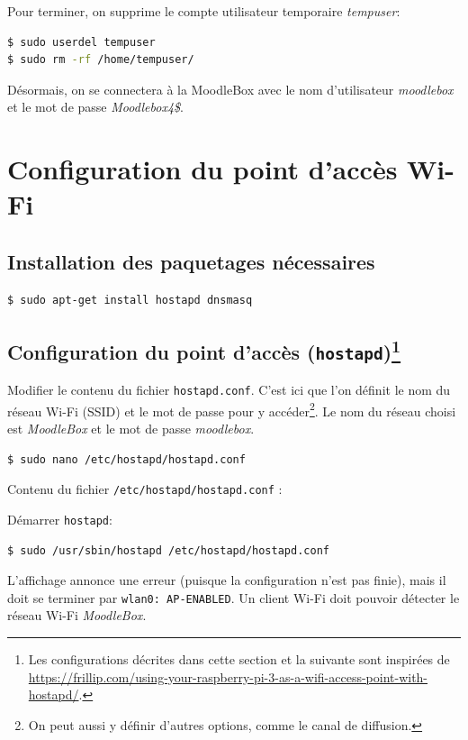\documentclass[11pt]{article}
\begin{document}
Pour terminer, on supprime le compte utilisateur temporaire \emph{tempuser}:
\begin{lstlisting}[language=bash]
$ sudo userdel tempuser
$ sudo rm -rf /home/tempuser/
\end{lstlisting}

Désormais, on se connectera à la MoodleBox avec le nom d'utilisateur \emph{moodlebox} et le mot de passe \emph{Moodlebox4\$}.

\section{Configuration du point d'accès Wi-Fi}

\subsection{Installation des paquetages nécessaires}

\begin{lstlisting}[language=bash]
$ sudo apt-get install hostapd dnsmasq
\end{lstlisting}

\subsection[Configuration du point d'accès (\lstinline{hostapd})]{Configuration du point d'accès (\lstinline{hostapd})\footnote{Les configurations décrites dans cette section et la suivante sont inspirées de \url{https://frillip.com/using-your-raspberry-pi-3-as-a-wifi-access-point-with-hostapd/}.}}

Modifier le contenu du fichier \lstinline{hostapd.conf}. C'est ici que l'on définit le nom du réseau Wi-Fi (SSID) et le mot de passe pour y accéder\footnote{On peut aussi y définir d'autres options, comme le canal de diffusion.}. Le nom du réseau choisi est \emph{MoodleBox} et le mot de passe \emph{moodlebox}.

\begin{lstlisting}[language=bash]
$ sudo nano /etc/hostapd/hostapd.conf
\end{lstlisting}

Contenu du fichier \lstinline{/etc/hostapd/hostapd.conf} :



\begin{verification}
Démarrer \lstinline{hostapd}:
\begin{lstlisting}[language=bash]
$ sudo /usr/sbin/hostapd /etc/hostapd/hostapd.conf
\end{lstlisting}

L'affichage annonce une erreur (puisque la configuration n'est pas finie), mais il doit se terminer par \lstinline{wlan0: AP-ENABLED}. Un client Wi-Fi doit pouvoir détecter le réseau Wi-Fi \emph{MoodleBox}.
\end{verification}
\end{document}
